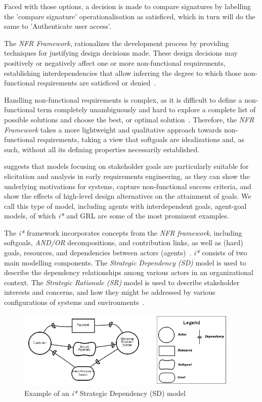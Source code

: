 \documentclass[dissertation,final]{softeng}
\begin{document}
Faced with those options, a decision is made to compare signatures by labelling the 'compare signature' operationalisation as satisficed, which in turn will do the same to 'Authenticate user access'.

The \emph{NFR Framework}, rationalizes the development process by providing techniques for justifying design decisions made. These design decisions may positively or negatively affect one or more non-functional requirements, establishing interdependencies that allow inferring the degree to which those non-functional requirements are satisficed or denied~\citep{Chung2000}.

Handling non-functional requirements is complex, as it is difficult to define a non-functional term completely unambiguously and hard to explore a complete list of possible solutions and choose the best, or optimal solution~\citep{Chung:2009vg}. Therefore, the \emph{NFR Framework} takes a more lightweight and qualitative approach towards non-functional requirements, taking a view that softgoals are idealizations and, as such, without all its defining properties necessarily established.

\citet{Horkoff2012} suggests that models focusing on stakeholder goals are particularly suitable for elicitation and analysis in early requirements engineering, as they can show the underlying motivations for systems, capture non-functional success criteria, and show the effects of high-level design alternatives on the attainment of goals. We call this type of model, including agents with interdependent goals, agent-goal models, of which \emph{i*} and GRL are some of the most prominent examples.

The \emph{i*} framework incorporates concepts from the \emph{NFR framework}, including softgoals, \emph{AND/OR} decompositions, and contribution links, as well as (hard) goals, resources, and dependencies between actors (agents)~\citep{Horkoff2013}. \emph{i*} consists of two main modelling components. The \emph{Strategic Dependency (SD)} model is used to describe the dependency relationships among various actors in an organizational context. The \emph{Strategic Rationale (SR)} model is used to describe stakeholder interests and concerns, and how they might be addressed by various configurations of systems and environments~\citep{Yu1997}.

\begin{figure}[h]
\includegraphics[width=0.95\textwidth]{istar_example}
\centering
\caption[Example of an \emph{i*} Strategic Dependency (SD) model]{Example of an \emph{i*} Strategic Dependency (SD) model~\citep{Roy:2007wyba}}
\label{fig:istar_example}
\end{figure}
\end{document}
